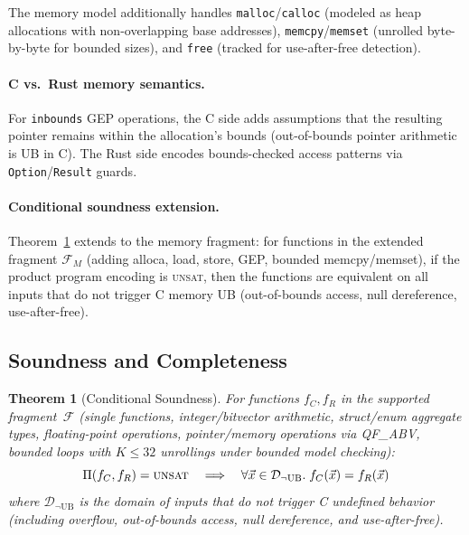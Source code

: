 \documentclass[11pt]{article}
\newtheorem{theorem}{Theorem}
\newcommand{\UNSAT}{\textsc{unsat}}
\begin{document}
The memory model additionally handles \texttt{malloc}/\texttt{calloc}
(modeled as heap allocations with non-overlapping base addresses),
\texttt{memcpy}/\texttt{memset} (unrolled byte-by-byte for bounded sizes),
and \texttt{free} (tracked for use-after-free detection).

\paragraph{C vs.\ Rust memory semantics.}
For \texttt{inbounds} GEP operations, the C side adds assumptions that
the resulting pointer remains within the allocation's bounds (out-of-bounds
pointer arithmetic is UB in C).  The Rust side encodes bounds-checked access
patterns via \texttt{Option}/\texttt{Result} guards.

\paragraph{Conditional soundness extension.}
Theorem~\ref{thm:sound} extends to the memory fragment:
for functions in the extended fragment $\mathcal{F}_M$ (adding alloca,
load, store, GEP, bounded memcpy/memset), if the product program encoding
is \UNSAT{}, then the functions are equivalent on all inputs that do not
trigger C memory UB (out-of-bounds access, null dereference, use-after-free).

\subsection{Soundness and Completeness}

\begin{theorem}[Conditional Soundness]\label{thm:sound}
For functions $f_C, f_R$ in the supported fragment~$\mathcal{F}$ (single
functions, integer/bitvector arithmetic, struct/enum aggregate types,
floating-point operations, pointer/memory operations via QF\_ABV,
bounded loops with $K \leq 32$ unrollings under bounded model checking):
\[
\Pi(f_C, f_R) = \UNSAT{}
\quad\Longrightarrow\quad
\forall \vec{x} \in \mathcal{D}_{\neg\mathrm{UB}}.\;
f_C(\vec{x}) = f_R(\vec{x})
\]
where $\mathcal{D}_{\neg\mathrm{UB}}$ is the domain of inputs that do not
trigger C undefined behavior (including overflow, out-of-bounds access,
null dereference, and use-after-free).
\end{theorem}
\end{document}

